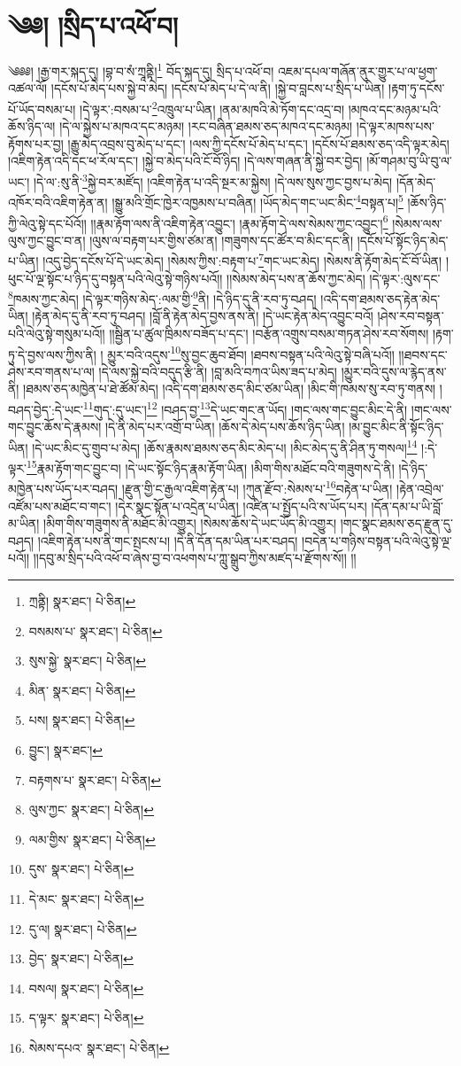 \setcounter{footnote}{0} 
\chapter{༄༅། །སྲིད་པ་འཕོ་བ།}༄༅༅། །རྒྱ་གར་སྐད་དུ། །བྷ་བ་སཾ་ཀྲཱནྟི།\footnote{ཀྲནྟི།  སྣར་ཐང་།  པེ་ཅིན། } བོད་སྐད་དུ། སྲིད་པ་འཕོ་བ། འཇམ་དཔལ་གཞོན་ནུར་གྱུར་པ་ལ་ཕྱག་འཚལ་ལོ། །དངོས་པོ་མེད་པས་སྐྱེ་བ་མེད། །དངོས་པོ་མེད་པ་དེ་ལ་ནི། །སྐྱེ་བ་བླངས་པ་སྲིད་པ་ཡིན། །རྟག་ཏུ་དངོས་པོ་ཡོད་བསམ་པ། །དེ་ལྟར་:བསམ་པ་\footnote{བསམས་པ་  སྣར་ཐང་།  པེ་ཅིན། }འཁྲུལ་པ་ཡིན། །ནམ་མཁའི་མེ་ཏོག་དང་འདྲ་བ། །མཁའ་དང་མཉམ་པའི་ཆོས་ཉིད་ལ། །དེ་ལ་སྐྱེས་པ་མཁའ་དང་མཉམ། །རང་བཞིན་ཐམས་ཅད་མཁའ་དང་མཉམ། །དེ་ལྟར་མཁས་པས་རྟོགས་པར་བྱ། །རྒྱུ་མེད་འབྲས་བུ་མེད་པ་དང་། །ལས་ཀྱི་དངོས་པོ་མེད་པ་དང་། །དངོས་པོ་ཐམས་ཅད་འདི་ལྟར་མེད། །འཇིག་རྟེན་འདི་དང་ཕ་རོལ་དང་། །སྐྱེ་བ་མེད་པའི་ངོ་བོ་ཉིད། །དེ་ལས་གཞན་ནི་སྐྱེ་བར་བྱེད། །མོ་གཤམ་བུ་ཡི་བུ་ལ་ཡང་། །དེ་ལ་:སུ་ནི་\footnote{སུས་སྐྱེ་  སྣར་ཐང་།  པེ་ཅིན། }སྐྱེ་བར་མཛོད། །འཇིག་རྟེན་པ་འདི་སྔར་མ་སྐྱེས། །དེ་ལས་སུས་ཀྱང་བྱས་པ་མེད། །དོན་མེད་འཁོར་བའི་འཇིག་རྟེན་ན། །སྒྱུ་མའི་གྲོང་ཁྱེར་འཁྱམས་པ་བཞིན། །ཡོད་མེད་གང་ཡང་མིང་\footnote{མིན་  སྣར་ཐང་།  པེ་ཅིན། }བསྟན་པ།\footnote{པས།  སྣར་ཐང་།  པེ་ཅིན། } །ཆོས་ཉིད་ཀྱི་ལེའུ་སྟེ་དང་པོའོ།། །།རྣམ་རྟོག་ལས་ནི་འཇིག་རྟེན་འབྱུང་། །རྣམ་རྟོག་དེ་ལས་སེམས་ཀྱང་འབྱུང་།\footnote{བྱུང་།  སྣར་ཐང་། } །སེམས་ལས་ལུས་ཀྱང་བྱུང་བ་ན། །ལུས་ལ་བརྟག་པར་གྱིས་ཙམ་ན། །གཟུགས་དང་ཚོར་བ་མིང་དང་ནི། །དངོས་པོ་སྟོང་ཉིད་མེད་པ་ཡིན། །འདུ་བྱེད་དངོས་པོ་དེ་ཡང་མེད། །སེམས་ཀྱིས་:བརྟག་པ་\footnote{བརྟགས་པ་  སྣར་ཐང་།  པེ་ཅིན། }གང་ཡང་མེད། །སེམས་ནི་རྟོག་མེད་ངོ་བོ་ཡིན། །ཕུང་པོ་ལྔ་སྟོང་པ་ཉིད་དུ་བསྟན་པའི་ལེའུ་སྟེ་གཉིས་པའོ།། །།སེམས་མེད་པས་ན་ཆོས་ཀྱང་མེད། །དེ་ལྟར་:ལུས་དང་\footnote{ལུས་ཀྱང་  སྣར་ཐང་།  པེ་ཅིན། }ཁམས་ཀྱང་མེད། །དེ་ལྟར་གཉིས་མེད་:ལམ་གྱི་\footnote{ལམ་གྱིས་  སྣར་ཐང་།  པེ་ཅིན། }ནི། །དེ་ཉིད་དུ་ནི་རབ་ཏུ་བཤད། །འདི་དག་ཐམས་ཅད་རྟེན་མེད་ཡིན། །རྟེན་མེད་དུ་ནི་རབ་ཏུ་བཤད། །བློ་ནི་རྟེན་མེད་བྱས་ནས་ནི། །དེ་ཡང་རྟེན་མེད་འབྱུང་བའོ། །ཤེས་རབ་བསྟན་པའི་ལེའུ་སྟེ་གསུམ་པའོ།། །།སྦྱིན་པ་ཚུལ་ཁྲིམས་བཟོད་པ་དང་། །བརྩོན་འགྲུས་བསམ་གཏན་ཤེས་རབ་སོགས། །རྟག་ཏུ་དེ་བྱས་ལས་ཀྱིས་ནི། །
མྱུར་བའི་འདུས་\footnote{དུས་  སྣར་ཐང་།  པེ་ཅིན། }སུ་བྱང་ཆུབ་ཐོབ། །ཐབས་བསྟན་པའི་ལེའུ་སྟེ་བཞི་པའོ།། །།ཐབས་དང་ཤེས་རབ་གནས་པ་ལ། །དེ་ལས་སྐྱེ་བའི་བདུད་རྩི་ནི། །བླ་མའི་བཀའ་ཡིས་ཟད་པ་མེད། །མྱུར་བའི་དུས་ལ་རྙེད་ནས་ནི། །ཐམས་ཅད་མཁྱེན་པ་ཐེ་ཚོམ་མེད། །འདི་དག་ཐམས་ཅད་མིང་ཙམ་ཡིན། །མིང་གི་ཁམས་སུ་རབ་ཏུ་གནས། །བཤད་བྱེད་:དེ་ཡང་\footnote{དེ་མང་  སྣར་ཐང་།  པེ་ཅིན། }གུད་:དུ་ཡང་།\footnote{དུ་ལ།  སྣར་ཐང་།  པེ་ཅིན། } །བཤད་བྱ་\footnote{བྱེད་  སྣར་ཐང་།  པེ་ཅིན། }དེ་ཡང་གང་ན་ཡོད། །གང་ལས་གང་བྱུང་མིང་དེ་ནི། །གང་ལས་གང་བྱུང་ཆོས་དེ་རྣམས། །དེ་ནི་མེད་པར་འགྲོ་བ་ཡིན། །ཆོས་དེ་མེད་པས་ཆོས་ཉིད་ཡིན། །མ་བྱུང་མིང་ནི་སྟོང་ཉིད་ཡིན། །དེ་ཡང་མིང་དུ་གྲུབ་པ་མེད། །ཆོས་རྣམས་ཐམས་ཅད་མིང་མེད་པ། །མིང་མེད་དུ་ནི་ཤིན་ཏུ་གསལ།\footnote{བསལ།  སྣར་ཐང་།  པེ་ཅིན། } །:དེ་ལྟར་\footnote{ད་ལྟར་  སྣར་ཐང་།  པེ་ཅིན། }རྣམ་རྟོག་གང་བྱུང་བ། །དེ་ཡང་སྟོང་ཉིད་རྣམ་རྟོག་ཡིན། །མིག་གིས་མཐོང་བའི་གཟུགས་དེ་ནི། །དེ་ཉིད་མཁྱེན་པས་ཡོད་པར་བཤད། །རྫུན་གྱི་ང་རྒྱལ་འཇིག་རྟེན་པ། །ཀུན་རྫོབ་:སེམས་པ་\footnote{སེམས་དཔའ་  སྣར་ཐང་།  པེ་ཅིན། }བརྟེན་པ་ཡིན། །རྟེན་འབྲེལ་འཛོམ་པས་མཐོང་བ་གང་། །དེར་སྣང་སྟོན་པ་འདྲེན་པ་ཡིན། །འཛིན་པ་སྤྱོད་པའི་ས་ཡོད་པར། །དོན་དམ་པ་ཡི་བློ་མ་ཡིན། །མིག་གིས་གཟུགས་ནི་མཐོང་མི་འགྱུར། །སེམས་ཆོས་དེ་ཡང་ཡོད་མི་འགྱུར། །གང་སྣང་ཐམས་ཅད་རྫུན་དུ་བཤད། །འཇིག་རྟེན་པས་ནི་གང་སྤངས་པ། །དེ་ནི་དོན་དམ་ཡིན་པར་བཤད། །བདེན་པ་གཉིས་བསྟན་པའི་ལེའུ་སྟེ་ལྔ་པའོ།། །།དབུ་མ་སྲིད་པའི་འཕོ་བ་ཞེས་བྱ་བ་འཕགས་པ་ཀླུ་སྒྲུབ་ཀྱིས་མཛད་པ་རྫོགས་སོ།། །།